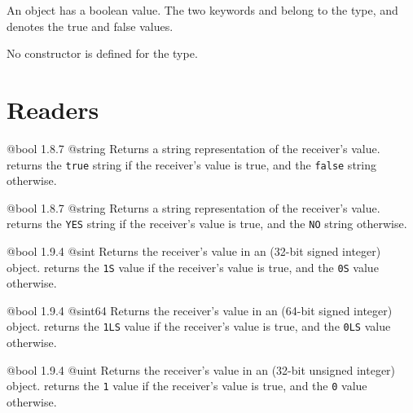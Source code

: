 

An  object has a boolean value. The two keywords  and  belong to the  type, and denotes the true and false values.

No constructor is defined for the  type.

\section{Readers}

{@bool}
{1.8.7}
{@string}
{Returns a string representation of the receiver's value.}
{returns the \texttt{\textquotedbl true\textquotedbl} string if the receiver's value is true, and the \texttt{\textquotedbl false\textquotedbl} string otherwise.}







{@bool}
{1.8.7}
{@string}
{Returns a string representation of the receiver's value.}
{returns the \texttt{\textquotedbl YES\textquotedbl} string if the receiver's value is true, and the \texttt{\textquotedbl NO\textquotedbl} string otherwise.}




{@bool}
{1.9.4}
{@sint}
{Returns the receiver's value in an  (32-bit signed integer) object.}
{returns the \texttt{1S}  value if the receiver's value is true, and the \texttt{0S}  value otherwise.}




{@bool}
{1.9.4}
{@sint64}
{Returns the receiver's value in an  (64-bit signed integer) object.}
{returns the \texttt{1LS}  value if the receiver's value is true, and the \texttt{0LS}  value otherwise.}




{@bool}
{1.9.4}
{@uint}
{Returns the receiver's value in an  (32-bit unsigned integer) object.}
{returns the \texttt{1}  value if the receiver's value is true, and the \texttt{0}  value otherwise.}




